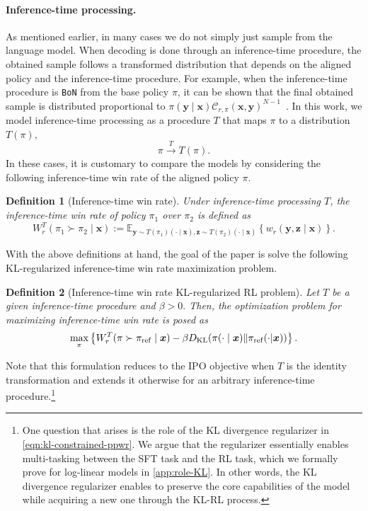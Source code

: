 \documentclass{article}
\newcommand{\by}{{\bm{y}}}
\newcommand{\bx}{{\bm{x}}}
\newcommand{\bz}{{\bm{z}}}
\newcommand{\reg}{\beta}
\newcommand{\E}{\mathbb{E}}
\newcommand{\KL}{D_{\text{KL}}}
\newcommand{\pp}{T}
\newcommand{\bp}{{\pi_{\rm ref}}} %
\newcommand{\op}{\pi} %
\newcommand{\qt}{\mathcal{C}}
\newtheorem{definition}{Definition}
\newcommand{\bofn}{\texttt{BoN}\xspace}
\begin{document}
\paragraph{Inference-time processing.} As mentioned earlier, in many cases we do not simply just sample from the language model. When decoding is done through an inference-time procedure, the obtained sample follows a transformed distribution that depends on the aligned policy and the inference-time procedure.
%
For example, when the inference-time procedure is \bofn from the base policy $\pi$, it can be shown that the final obtained sample is distributed proportional to $\pi(\by \mid \bx) \qt_{r, \pi}(\bx, \by)^{N-1}$~\cite[Lemma 1]{beirami2024theoretical}. In this work, we model inference-time processing as a procedure $\pp$ that maps $\pi$ to a distribution $\pp(\pi)$,
\[
    \pi \stackrel{T}{\longrightarrow} T(\pi).
\]
%
In these cases, it is customary to compare the models by considering the following inference-time win rate of the aligned policy $\pi$.
\begin{definition}[Inference-time win rate] \label{def:pp_wr}
Under inference-time processing $T$, the inference-time win rate of policy $\pi_1$ over $\pi_2$ is defined as %
\begin{equation} 
     W^\pp_r(\pi_1 \succ \pi_2 \mid \bx) := \E_{\by \sim \pp(\pi_1)(\cdot \mid \bx), \bz \sim \pp(\pi_2)(\cdot \mid \bx)} \left\{w_r(\by, \bz \mid \bx)\right\}.
\end{equation}
%
\end{definition}


%



With the above definitions at hand, the goal of the paper is solve the following KL-regularized inference-time win rate maximization problem.

\begin{definition}[Inference-time win rate KL-regularized RL problem]
Let $T$ be a given inference-time procedure and $\reg > 0.$ Then, the optimization problem for maximizing inference-time win rate is posed as %
%
\begin{align} \label{eqn:kl-constrained-ppwr}
  \max_\op \left\{ W^\pp_r(\op \succ \bp \mid \bx) -\reg \KL(\op(\cdot \mid \bx) \| \bp(\cdot | \bx))\right\}.
\end{align}
\label{def:kl-constrained-ppwr}
\end{definition}
Note that this formulation reduces to the IPO objective \citep[Equation (8)]{azar2023general} when $T$ is the identity transformation and extends it otherwise for an arbitrary inference-time procedure.\footnote{One question that arises is the role of the KL divergence regularizer in \cref{eqn:kl-constrained-ppwr}. We argue that the regularizer essentially enables multi-tasking between the SFT task and the RL task, which we formally prove for log-linear models in \cref{app:role-KL}.  In other words, the KL divergence regularizer enables to preserve the core capabilities of the model while acquiring a new one through the KL-RL process.}
\end{document}

